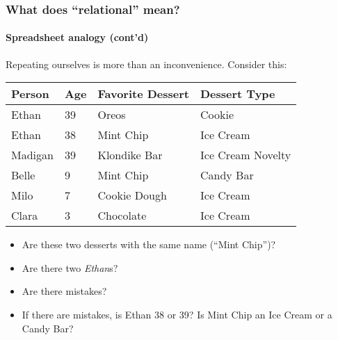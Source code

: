 \documentclass{beamer}
\begin{document}
\begin{frame}
  \frametitle{What does ``relational'' mean?}
  \framesubtitle{Spreadsheet analogy (cont'd)}

  Repeating ourselves is more than an inconvenience. Consider this:

  \begin{table}[]
    \small
    \begin{tabular}{@{}llll@{}}
      \toprule
      Person  & Age & Favorite Dessert & Dessert Type      \\ \midrule
      Ethan   & 39  & Oreos            & Cookie            \\
      Ethan   & 38  & Mint Chip        & Ice Cream         \\
      Madigan & 39  & Klondike Bar     & Ice Cream Novelty \\
      Belle   & 9   & Mint Chip        & Candy Bar         \\
      Milo    & 7   & Cookie Dough     & Ice Cream         \\
      Clara   & 3   & Chocolate        & Ice Cream         \\ \bottomrule
    \end{tabular}
  \end{table}


  \begin{itemize}
    \item Are these two desserts with the same name (``Mint Chip'')?
    \item Are there two \textit{Ethan}s?
    \item Are there mistakes?
    \item If there are mistakes, is Ethan 38 or 39? Is Mint Chip an Ice Cream
          or a Candy Bar?
  \end{itemize}
\end{frame}
\end{document}
